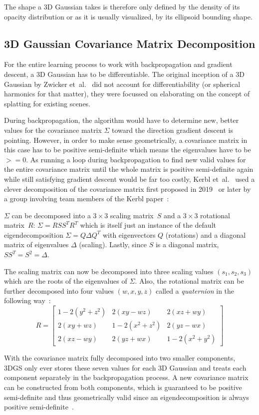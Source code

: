 The shape a 3D Gaussian takes is therefore only defined by the density of its opacity distribution or as it is usually visualized, by its ellipsoid bounding shape.

\subsection{3D Gaussian Covariance Matrix Decomposition}
\label{ch:matrix_decomp}
For the entire learning process to work with backpropagation and gradient descent, a 3D Gaussian has to be differentiable. The original inception of a 3D Gaussian by Zwicker et~al.~\cite{zwickerSurfaceSplatting2001} did not account for differentiability (or spherical harmonics for that matter), they were focussed on elaborating on the concept of splatting for existing scenes.

During backpropagation, the algorithm would have to determine new, better values for
\newpage
\hspace{-5.2mm}
the covariance matrix $\Sigma$ toward the direction gradient descent is pointing. However, in order to make sense geometrically, a covariance matrix in this case has to be positive semi-definite which means the eigenvalues have to be $>=0$. 
As running a loop during backpropagation to find new valid values for the entire covariance matrix until the whole matrix is positive semi-definite again while still satisfying gradient descent would be far too costly, Kerbl et~al.~\cite{kerbl3DGaussianSplatting2023} used a clever decomposition of the covariance matrix first proposed in 2019~\cite{yifanDifferentiableSurfaceSplatting2019} or later by a group involving team members of the Kerbl paper~\cite{kopanasPointBasedNeuralRendering2021}:

$\Sigma$ can be decomposed into a $3\times 3$ scaling matrix~$S$ and a $3\times 3$ rotational matrix~$R$: $\Sigma = RSS^TR^T$ which is itself just an instance of the default eigendecomposition $\Sigma = Q\Delta Q^T$ with eigenvectors $Q$ (rotations) and a diagonal matrix of eigenvalues $\Delta$ (scaling). Lastly, since $S$ is a diagonal matrix, $SS^T=S^2=\Delta$.

The scaling matrix can now be decomposed into three scaling values $(s_1, s_2, s_3)$ which are the roots of the eigenvalues of $\Sigma$. Also, the rotational matrix can be further decomposed into four values $(w, x, y, z)$ called a \textit{quaternion} in the following way~\cite{Shoemake1985AnimatingRW}:
$$
R =
\begin{bmatrix} 
    1 - 2(y^2 + z^2) & 2(xy - wz) & 2(xz + wy) \\
    2(xy + wz) & 1 - 2(x^2 + z^2) & 2(yz - wx) \\ 
    2(xz - wy) & 2(yz + wx) & 1 - 2(x^2 + y^2) 
\end{bmatrix}
$$

With the covariance matrix fully decomposed into two smaller components, 3DGS only ever stores these seven values for each 3D Gaussian and treats each component separately in the backpropagation process. A new covariance matrix can be constructed from both components, which is guaranteed to be positive semi-definite and thus geometrically valid since an eigendecomposition is always positive semi-definite~\cite{riedel2025mathematische}.
